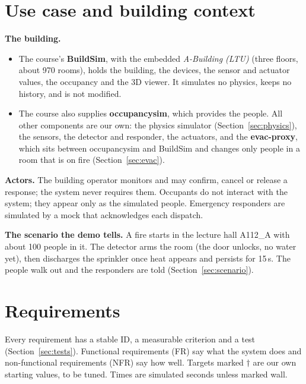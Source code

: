 \documentclass[11pt]{article}
\providecommand{\tightlist}{\setlength{\itemsep}{0pt}\setlength{\parskip}{0pt}}
\begin{document}
\section{Use case and building context}

\textbf{The building.}
\begin{itemize}\tightlist
\item The course's \textbf{BuildSim}, with the embedded \emph{A-Building (LTU)} (three floors, about 970 rooms), holds the building, the devices, the sensor and actuator values, the occupancy and the 3D viewer. It simulates no physics, keeps no history, and is not modified.
\item The course also supplies \textbf{occupancysim}, which provides the people. All other components are our own: the physics simulator (Section~\ref{sec:physics}), the sensors, the detector and responder, the actuators, and the \textbf{evac-proxy}, which sits between occupancysim and BuildSim and changes only people in a room that is on fire (Section~\ref{sec:evac}).
\end{itemize}

\textbf{Actors.} The building operator monitors and may confirm, cancel or release a response; the system never requires them. Occupants do not interact with the system; they appear only as the simulated people. Emergency responders are simulated by a mock that acknowledges each dispatch.

\textbf{The scenario the demo tells.} A fire starts in the lecture hall A112\_A with about 100 people in it. The detector arms the room (the door unlocks, no water yet), then discharges the sprinkler once heat appears and persists for 15\,s. The people walk out and the responders are told (Section~\ref{sec:scenario}).

\section{Requirements}

Every requirement has a stable ID, a measurable criterion and a test (Section~\ref{sec:tests}). Functional requirements (FR) say what the system does and non-functional requirements (NFR) say how well. Targets marked $\dagger$ are our own starting values, to be tuned. Times are simulated seconds unless marked wall.
\end{document}
